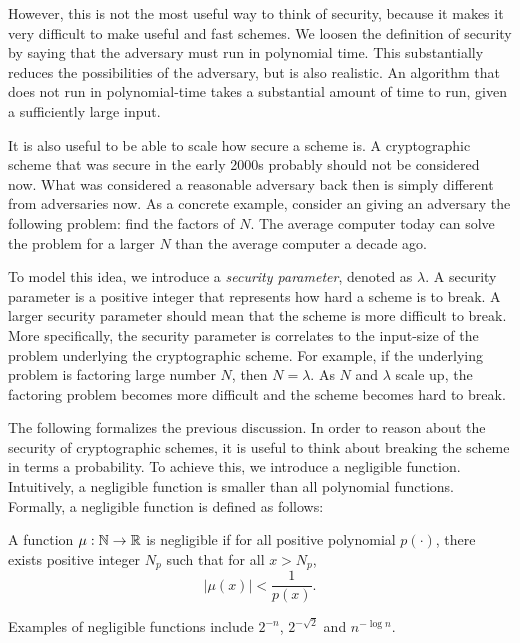 However, this is not the most useful way to think of security, because it makes it very difficult to make useful and fast schemes. 
We loosen the definition of security by saying that the adversary must run in polynomial time. 
This substantially reduces the possibilities of the adversary, but is also realistic. 
An algorithm that does not run in polynomial-time takes a substantial amount of time to run, given a sufficiently large input. 

It is also useful to be able to scale how secure a scheme is. 
A cryptographic scheme that was secure in the early 2000s probably should not be considered now. 
What was considered a reasonable adversary back then is simply different from adversaries now. 
As a concrete example, consider an giving an adversary the following problem: find the factors of $N$. 
The average computer today can solve the problem for a larger $N$ than the average computer a decade ago.

To model this idea, we introduce a \textit{security parameter}, denoted as $\lambda$.
A security parameter is a positive integer that represents how hard a scheme is to break. 
A larger security parameter should mean that the scheme is more difficult to break. 
More specifically, the security parameter is correlates to the input-size of the problem underlying the cryptographic scheme. 
For example, if the underlying problem is factoring large number $N$, then $N = \lambda$. 
As $N$ and $\lambda$ scale up, the factoring problem becomes more difficult and the scheme becomes hard to break. 

The following formalizes the previous discussion.
In order to reason about the security of cryptographic schemes, it is useful to think about breaking the scheme in terms a probability. 
To achieve this, we introduce a negligible function.
Intuitively, a negligible function is smaller than all polynomial functions. 
Formally, a negligible function is defined as follows:

\begin{definition}
\label{defn:negible}
A function $\mu : \mathbb{N} \to \mathbb{R}$ is negligible if for all positive polynomial $p(\cdot)$, there exists positive integer $N_p$ such that for all $x > N_p$, 
\begin{equation}
    |\mu(x)| < \frac{1}{p(x)}.
\end{equation}
\cite{goldreich}
\end{definition}

Examples of negligible functions include $2^{-n}$, $2^{- \sqrt{2}}$ and $n^{- \log n}$. 

